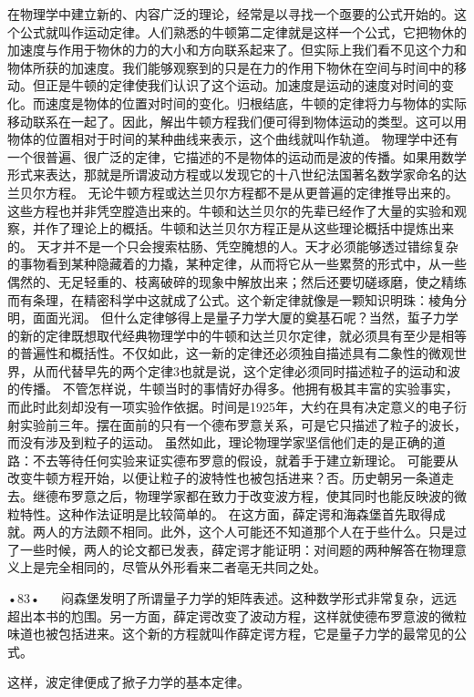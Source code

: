 在物理学中建立新的、内容广泛的理论，经常是以寻找一个亟要的公式开始的。这个公式就叫作运动定律。人们熟悉的牛顿第二定律就是这样一个公式，它把物休的加速度与作用于物休的力的大小和方向联系起来了。但实际上我们看不见这个力和物体所获的加速度。我们能够观察到的只是在力的作用下物休在空间与时间中的移动。但正是牛顿的定律使我们认识了这个运动。加速度是运动的速度对时间的变化。而速度是物体的位置对时间的变化。归根结底，牛顿的定律将力与物体的实际移动联系在一起了。因此，解出牛顿方程我们便可得到物体运动的类型。这可以用物体的位置相对于时间的某种曲线来表示，这个曲线就叫作轨道。
物理学中还有一个很普遍、很广泛的定律，它描述的不是物体的运动而是波的传播。如果用数学形式来表达，那就是所谓波动方程或以发现它的十八世纪法国著名数学家命名的达兰贝尔方程。
无论牛顿方程或达兰贝尔方程都不是从更普遍的定律推导出来的。这些方程也并非凭空膛造出来的。牛顿和达兰贝尔的先辈已经作了大量的实验和观察，并作了理论上的概括。牛顿和达兰贝尔方程正是从这些理论概括中提炼出来的。
天才并不是一个只会搜索枯肠、凭空腌想的人。天才必须能够透过错综复杂的事物看到某种隐藏着的力撬，某种定律，从而将它从一些累赘的形式中，从一些偶然的、无足轻重的、枝离破碎的现象中解放出来；然后还要切磋琢磨，使之精练而有条理，在精密科学中这就成了公式。这个新定律就像是一颗知识明珠：棱角分明，面面光润。
但什么定律够得上是量子力学大厦的奠基石呢？当然，蜇子力学的新的定律既想取代经典物理学中的牛顿和达兰贝尔定律，就必须具有至少是相等的普遍性和概括性。不仅如此，这一新的定律还必须独自描述具有二象性的微观世界，从而代替早先的两个定律3也就是说，这个定律必须同时描述粒子的运动和波的传播。
不管怎样说，牛顿当时的事情好办得多。他拥有极其丰富的实验事实，而此时此刻却没有一项实验作依据。时间是1925年，大约在具有决定意义的电子衍射实验前三年。摆在面前的只有一个德布罗意关系，可是它只描述了粒子的波长，而没有涉及到粒子的运动。
虽然如此，理论物理学家坚信他们走的是正确的道路：不去等待任何实验来证实德布罗意的假设，就着手于建立新理论。
可能要从改变牛顿方程开始，以便让粒子的波特性也被包括进来？否。历史朝另一条道走去。继德布罗意之后，物理学家都在致力于改变波方程，使其同时也能反映波的微粒特性。这种作法证明是比较简单的。
在这方面，薛定谔和海森堡首先取得成就。两人的方法颇不相同。此外，这个人可能还不知道那个人在于些什么。只是过了一些时候，两人的论文都已发表，薛定谔才能证明：对间题的两种解答在物理意义上是完全相同的，尽管从外形看来二者亳无共同之处。

•83•
  
闷森堡发明了所谓量子力学的矩阵表述。这种数学形式非常复杂，远远超出本书的尥围。另一方面，薛定谔改变了波动方程，这样就使德布罗意波的微粒味道也被包括进来。这个新的方程就叫作薛定谔方程，它是量子力学的最常见的公式。

这样，波定律便成了掀子力学的基本定律。

